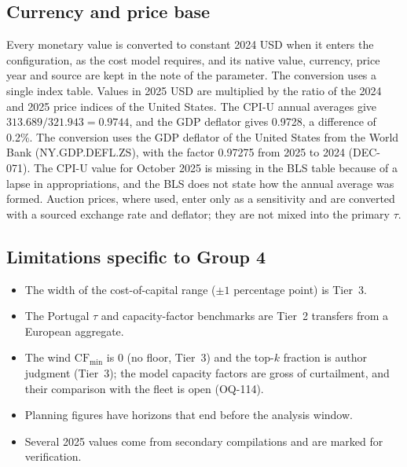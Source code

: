 \subsection{Currency and price base}
\label{sec:g4-currency}
Every monetary value is converted to constant 2024 USD when it enters the configuration, as the cost model requires, and its native value, currency, price year and source are kept in the note of the parameter. The conversion uses a single index table. Values in 2025 USD are multiplied by the ratio of the 2024 and 2025 price indices of the United States. The CPI-U annual averages \citep{bls_cpiu} give $313.689/321.943 = 0.9744$, and the GDP deflator gives 0.9728, a difference of 0.2\%. The conversion uses the GDP deflator of the United States from the World Bank (NY.GDP.DEFL.ZS), with the factor 0.97275 from 2025 to 2024 (DEC-071).
The CPI-U value for October 2025 is missing in the BLS table because of a lapse in appropriations, and the BLS does not state how the annual average was formed. %
Auction prices, where used, enter only as a sensitivity and are converted with a sourced exchange rate and deflator; they are not mixed into the primary $\tau$.

\subsection{Limitations specific to Group 4}
\begin{itemize}
\item The width of the cost-of-capital range ($\pm 1$ percentage point) is Tier~3.
\item The Portugal $\tau$ and capacity-factor benchmarks are Tier~2 transfers from a European aggregate.
\item The wind $\mathrm{CF}_{\min}$ is 0 (no floor, Tier~3) and the top-$k$ fraction is author judgment (Tier~3); the model capacity factors are gross of curtailment, and their comparison with the fleet is open (OQ-114).
\item Planning figures have horizons that end before the analysis window.
\item Several 2025 values come from secondary compilations and are marked for verification.
\end{itemize}
